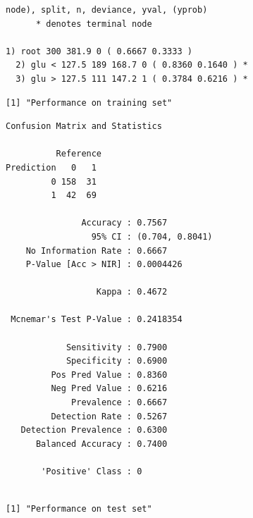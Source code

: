 \documentclass[
  letterpaper,
  DIV=11,
  numbers=noendperiod]{scrartcl}
\begin{document}
\begin{verbatim}
node), split, n, deviance, yval, (yprob)
      * denotes terminal node

1) root 300 381.9 0 ( 0.6667 0.3333 )  
  2) glu < 127.5 189 168.7 0 ( 0.8360 0.1640 ) *
  3) glu > 127.5 111 147.2 1 ( 0.3784 0.6216 ) *
\end{verbatim}

\begin{verbatim}
[1] "Performance on training set"
\end{verbatim}

\begin{verbatim}
Confusion Matrix and Statistics

          Reference
Prediction   0   1
         0 158  31
         1  42  69
                                         
               Accuracy : 0.7567         
                 95% CI : (0.704, 0.8041)
    No Information Rate : 0.6667         
    P-Value [Acc > NIR] : 0.0004426      
                                         
                  Kappa : 0.4672         
                                         
 Mcnemar's Test P-Value : 0.2418354      
                                         
            Sensitivity : 0.7900         
            Specificity : 0.6900         
         Pos Pred Value : 0.8360         
         Neg Pred Value : 0.6216         
             Prevalence : 0.6667         
         Detection Rate : 0.5267         
   Detection Prevalence : 0.6300         
      Balanced Accuracy : 0.7400         
                                         
       'Positive' Class : 0              
                                         
\end{verbatim}

\begin{verbatim}
[1] "Performance on test set"
\end{verbatim}
\end{document}
